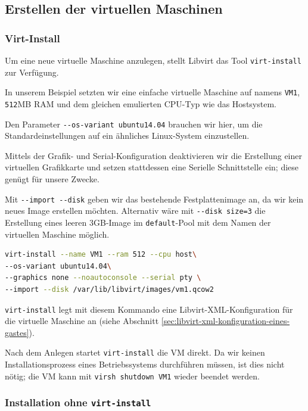 



\subsection{Erstellen der virtuellen Maschinen}


\subsubsection{Virt-Install}\label{sec:virt-install}
Um eine neue virtuelle Maschine anzulegen, stellt Libvirt das Tool \lstinline|virt-install| zur Verfügung.

In unserem Beispiel setzten wir eine einfache virtuelle Maschine auf namens \lstinline|VM1|, \lstinline|512|MB RAM und dem gleichen emulierten CPU-Typ wie das Hostsystem.

Den Parameter \lstinline|--os-variant ubuntu14.04| brauchen wir hier, um die Standardeinstellungen auf ein ähnliches Linux-System einzustellen.

Mittels der Grafik- und Serial-Konfiguration deaktivieren wir die Erstellung einer virtuellen Grafikkarte und setzen stattdessen eine Serielle Schnittstelle ein; diese genügt für unsere Zwecke.

Mit \lstinline|--import --disk| geben wir das bestehende Festplattenimage an, da wir kein neues Image erstellen möchten. Alternativ wäre mit \lstinline|--disk size=3| die Erstellung eines leeren 3GB-Image im \lstinline|default|-Pool mit dem Namen der virtuellen Maschine möglich.

\begin{lstlisting}[language=bash]
virt-install --name VM1 --ram 512 --cpu host\
--os-variant ubuntu14.04\
--graphics none --noautoconsole --serial pty \
--import --disk /var/lib/libvirt/images/vm1.qcow2
\end{lstlisting}

\lstinline|virt-install| legt mit diesem Kommando eine Libvirt-XML-Konfiguration für die virtuelle Maschine an (siehe Abschnitt \ref{sec:libvirt-xml-konfiguration-eines-gastes}).

Nach dem Anlegen startet \lstinline|virt-install| die VM direkt. Da wir keinen Installationsprozess eines Betriebssystems durchführen müssen, ist dies nicht nötig; die VM kann mit \lstinline|virsh shutdown VM1| wieder beendet werden.

\subsubsection{Installation ohne \lstinline|virt-install|}

